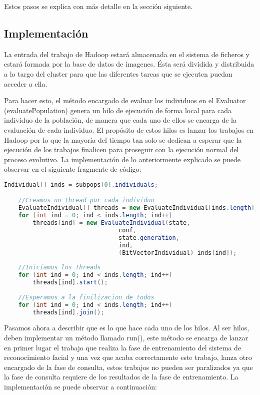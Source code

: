 Estos pasos se explica con m\'as detalle en la secci\'on siguiente.

\subsection{Implementaci\'on} \label{problema-facerecognition-implementacion}

La entrada del trabajo de Hadoop estar\'a almacenada en el sistema de ficheros y estar\'a formada por la base de datos de imagenes. \'Esta ser\'a dividida y distribuida a lo targo del cluster para que las diferentes tareas que se ejecuten puedan acceder a ella.

Para hacer esto, el método encargado de evaluar los individuos en el Evaluator (evaluatePopulation) genera un hilo de ejecución de forma local para cada individuo de la poblaci\'on, de manera que cada uno de ellos se encarga de la evaluación de cada individuo. El propósito de estos hilos es lanzar los trabajos en Hadoop por lo que la mayoría del tiempo tan solo se dedican a esperar que la ejecución de los trabajos finalicen para proseguir con la ejecución normal del proceso evolutivo. La implementación de lo anteriormente explicado se puede observar en el siguiente fragmente de código:

\begin{lstlisting}[language=Java]
	Individual[] inds = subpops[0].individuals;

	//Creamos un thread por cada individuo
	EvaluateIndividual[] threads = new EvaluateIndividual[inds.length];
	for (int ind = 0; ind < inds.length; ind++)
		threads[ind] = new EvaluateIndividual(state, 
								conf, 
								state.generation, 
								ind, 
								(BitVectorIndividual) inds[ind]);
			
	//Iniciamos los threads
	for (int ind = 0; ind < inds.length; ind++)
		threads[ind].start();
			
	//Esperamos a la finilizacion de todos
	for (int ind = 0; ind < inds.length; ind++)
		threads[ind].join();
\end{lstlisting}

Pasamos ahora a describir que es lo que hace cada uno de los hilos. Al ser hilos, deben implementar un m\'etodo llamado run(), este método se encarga de lanzar en primer lugar el trabajo que realiza la fase de entrenamiento del sistema de reconocimiento facial y una vez que acaba correctamente este trabajo, lanza otro encargado de la fase de consulta, estos trabajos no pueden ser paralizados ya que la fase de consulta requiere de los resultados de la fase de entrenamiento. La implementación se puede observar a continuación:

